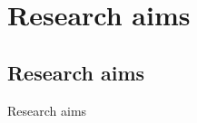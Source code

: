 \chapter{Research aims}
\label{Research aims}
  \singlespace
  \onehalfspace
  \acresetall

\section{Research aims}
\label{sec:Research aims}
Research aims